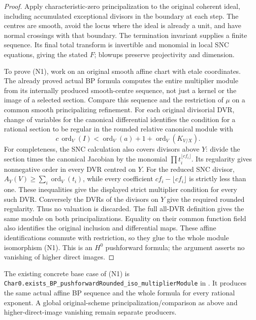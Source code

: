 \begin{proof}
Apply characteristic-zero principalization to the original coherent
ideal, including accumulated exceptional divisors in the boundary at
each step.  The centres are smooth, avoid the locus where the ideal is
already a unit, and have normal crossings with that boundary.  The
termination invariant supplies a finite sequence.  Its final total
transform is invertible and monomial in local SNC equations, giving
the stated $F$; blowups preserve projectivity and dimension.

To prove (N1), work on an original smooth affine chart with etale
coordinates.  The already proved actual BP formula computes the entire
multiplier module from its internally produced smooth-centre sequence,
not just a kernel or the image of a selected section.  Compare this
sequence and the restriction of $\mu$ on a common smooth principalizing
refinement.  For each original divisorial DVR, change of variables for
the canonical differential identifies the condition for a rational
section to be regular in the rounded relative canonical module with
\[
 c\,\operatorname{ord}_V(I)
 <\operatorname{ord}_V(a)+1+\operatorname{ord}_V(K_{V/X}).
\]
For completeness, the SNC calculation also covers divisors above $Y$:
divide the section times the canonical Jacobian by the monomial
$\prod t_i^{\lfloor cf_i\rfloor}$.  Its regularity gives nonnegative
order in every DVR centred on $Y$.  For the reduced SNC divisor,
$A_Y(V)\geq\sum_i\operatorname{ord}_V(t_i)$, while every coefficient
$cf_i-\lfloor cf_i\rfloor$ is strictly less than one.  These inequalities
give the displayed strict multiplier condition for every such DVR.
Conversely the DVRs of the divisors on $Y$ give the required rounded
regularity.  Thus no valuation is discarded.  The full all-DVR
definition gives the same module on both principalizations.
Equality on their common function
field also identifies the original inclusion and differential maps.
These affine identifications commute with restriction, so they glue to
the whole module isomorphism (N1).  This is an $H^0$ pushforward formula;
the argument asserts no vanishing of higher direct images.
\end{proof}

The existing concrete base case of (N1) is
\nolinkurl{Char0.exists_BP_pushforwardRounded_iso_multiplierModule}
in .  It produces the
same actual affine BP sequence and the whole formula for every rational
exponent.  A global original-scheme principalization/comparison as above
and higher-direct-image vanishing remain separate producers.

